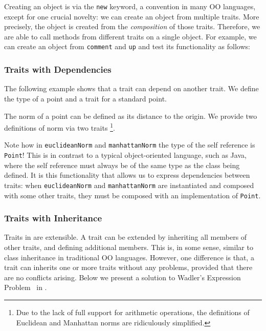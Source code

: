 Creating an object is via the \lstinline{new} keyword, a convention in many OO
languages, except for one crucial novelty: we can create an object from multiple
traits. More precisely, the object is created from the \textit{composition} of
those traits. Therefore, we are able to call methods from different traits on a
single object. For example, we can create an object from \lstinline$comment$ and
\lstinline$up$ and test its functionality as follows:


\subsubsection{Traits with Dependencies}

The following example shows that a trait can depend on another trait. We define
the type of a point and a trait for a standard point.


The norm of a point can be defined as its distance to the origin. We provide two
definitions of norm via two traits \footnote{Due to the lack of full support for
  arithmetic operations, the definitions of Euclidean and Manhattan norms are
  ridiculously simplified. }.


Note how in \lstinline$euclideanNorm$ and \lstinline$manhattanNorm$ the type of
the self reference is \lstinline$Point$! This is in contrast to a typical
object-oriented language, such as Java, where the self reference must always be
of the same type as the class being defined. It is this functionality that
allows us to express dependencies between traits: when \lstinline$euclideanNorm$
and \lstinline$manhattanNorm$ are instantiated and composed with some other
traits, they must be composed with an implementation of \lstinline$Point$.




\subsubsection{Traits with Inheritance}

Traits in \name are extensible. A trait can be extended by inheriting all
members of other traits, and defining additional members. This is, in some
sense, similar to class inheritance in traditional OO languages. However, one
difference is that, a trait can inherits one or more traits without any
problems, provided that there are no conflicts arising. Below we present a
solution to Wadler's Expression Problem~\cite{wadler1998expression} in \name.

